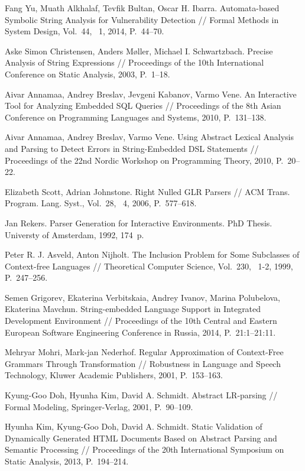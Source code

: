 \documentclass{llncs}
\begin{document}
%
%
\begin{thebibliography}{}
%
Fang Yu, Muath Alkhalaf, Tevfik Bultan, Oscar H. Ibarra.
Automata-based Symbolic String Analysis for Vulnerability Detection //
Formal Methods in System Design, Vol.~44, \textnumero~1, 2014, P.~44--70.

Aske Simon Christensen, Anders M{\o}ller, Michael I. Schwartzbach.
Precise Analysis of String Expressions //
Proceedings of the 10th International Conference on Static Analysis, 2003, P.~1--18.

Aivar Annamaa, Andrey Breslav, Jevgeni Kabanov, Varmo Vene.
An Interactive Tool for Analyzing Embedded SQL Queries //
Proceedings of the 8th Asian Conference on Programming Languages and Systems, 2010, P.~131--138.

Aivar Annamaa, Andrey Breslav, Varmo Vene. Using Abstract Lexical Analysis and Parsing to Detect 
Errors in String-Embedded DSL Statements // 
Proceedings of the 22nd Nordic Workshop on Programming Theory, 2010, P.~20--22. 

Elizabeth Scott, Adrian Johnstone.
Right Nulled GLR Parsers // ACM Trans. Program. Lang. Syst., Vol.~28, \textnumero~4,
2006, P.~577--618.

Jan Rekers.
Parser Generation for Interactive Environments. PhD Thesis. Universty of Amsterdam, 1992, 174~p.

Peter R. J. Asveld, Anton Nijholt.
The Inclusion Problem for Some Subclasses of Context-free Languages //
Theoretical Computer Science, Vol.~230, \textnumero~1-2, 1999, P.~247--256.

Semen Grigorev, Ekaterina Verbitskaia, Andrey Ivanov, Marina Polubelova, Ekaterina Mavchun.
String-embedded Language Support in Integrated Development Environment //
Proceedings of the 10th Central and Eastern European Software Engineering Conference in Russia, 2014, P.~21:1--21:11.

Mehryar Mohri, Mark-jan Nederhof.
Regular Approximation of Context-Free Grammars Through Transformation //
Robustness in Language and Speech Technology, Kluwer Academic Publishers, 2001, P.~153--163. 

Kyung-Goo Doh, Hyunha Kim, David A. Schmidt.
Abstract LR-parsing // Formal Modeling, Springer-Verlag, 2001, P.~90--109.

Hyunha Kim, Kyung-Goo Doh, David A. Schmidt.
Static Validation of Dynamically Generated HTML Documents Based on Abstract Parsing and Semantic Processing //
Proceedings of the 20th International Symposium on Static Analysis, 2013, P.~194--214.


\end{thebibliography}
\end{document}
